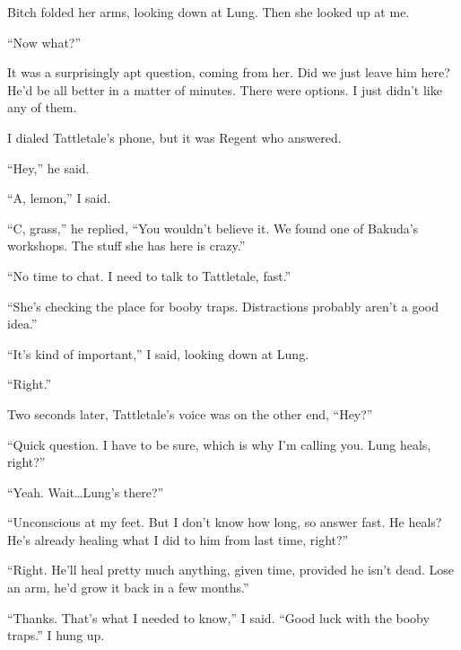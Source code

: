 Bitch folded her arms, looking down at Lung.  Then she looked up at me.



``Now what?''



It was a surprisingly apt question, coming from her.  Did we just leave him here?  He'd be all better in a matter of minutes.  There were options.  I just didn't like any of them.



I dialed Tattletale's phone, but it was Regent who answered.



``Hey,'' he said.



``A, lemon,'' I said.



``C, grass,'' he replied, ``You wouldn't believe it.  We found one of Bakuda's workshops.  The stuff she has here is crazy.''



``No time to chat.  I need to talk to Tattletale, fast.''



``She's checking the place for booby traps.  Distractions probably aren't a good idea.''



``It's kind of important,'' I said, looking down at Lung.



``Right.''



Two seconds later, Tattletale's voice was on the other end, ``Hey?''



``Quick question.  I have to be sure, which is why I'm calling you.  Lung heals, right?''



``Yeah.  Wait\ldots Lung's there?''



``Unconscious at my feet.  But I don't know how long, so answer fast.  He heals?  He's already healing what I did to him from last time, right?''



``Right.  He'll heal pretty much anything, given time, provided he isn't dead.  Lose an arm, he'd grow it back in a few months.''



``Thanks.  That's what I needed to know,''  I said.  ``Good luck with the booby traps.''  I hung up.



